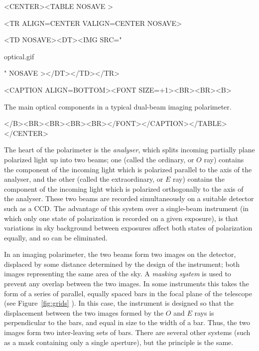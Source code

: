 \documentclass[twoside,11pt]{article}
\newcommand{\latex}[1]{#1}
\newcommand{\html}[1]{}
\renewcommand{\_}{\texttt{\symbol{95}}}
\newcommand{\htmlfig}[3]{
   \label{#1}
   \begin{rawhtml} <CENTER><TABLE NOSAVE > \end{rawhtml}
   \begin{rawhtml} <TR ALIGN=CENTER VALIGN=CENTER NOSAVE> \end{rawhtml}
   \begin{rawhtml} <TD NOSAVE><DT><IMG SRC=" \end{rawhtml}
   #2
   \begin{rawhtml} " NOSAVE ></DT></TD></TR> \end{rawhtml}
   \begin{rawhtml} <CAPTION ALIGN=BOTTOM><FONT SIZE=+1><BR><BR><B> \end{rawhtml}
   #3 
   \begin{rawhtml} </B><BR><BR><BR><BR></FONT></CAPTION></TABLE></CENTER> \end{rawhtml}
}
\begin{document}
\begin{htmlonly}
\htmlfig{fig:optical}{optical.gif}{The main optical components in a
typical dual-beam imaging polarimeter.}
\end{htmlonly}

The heart of the polarimeter is the \emph{analyser}, which splits incoming
partially plane polarized light up into two beams; one (called the
ordinary, or $O$ ray) contains the component of the incoming light
which is polarized parallel to the axis of the analyser, and the other
(called the extraordinary, or $E$ ray) contains the component of the
incoming light which is polarized orthogonally to the axis of the
analyser. These two beams are recorded simultaneously on a suitable
detector such as a CCD. The advantage of this system over a single-beam
instrument (in which only one state of polarization is recorded on a
given exposure), is that variations in sky background between exposures
affect both states of polarization equally, and so can be eliminated.

In an imaging polarimeter, the two beams form two images on the detector,
displaced by some distance determined by the design of the instrument;
both images representing the same area of the sky. A \emph{masking system}
is used to prevent any overlap between the two images. In some
instruments this takes the form of a series of parallel, equally spaced
bars in the focal plane of the telescope (see 
\latex{Figure~\ref{fig:grids}} \html{the next figure}). In
this case, the instrument is designed so that the displacement between
the two images formed by the $O$ and $E$ rays is perpendicular to the
bars, and equal in size to the width of a bar. Thus, the two images form
two inter-leaving sets of bars. There are several other systems (such as 
a mask containing only a single aperture), but the principle is the same.
\end{document}
